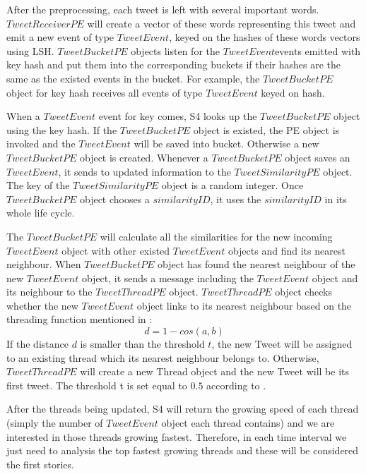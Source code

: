 \documentclass[a4paper,12pt]{article}
\begin{document}
After the preprocessing, each tweet is left with several important words. $TweetReceiverPE$ will create a vector of these words representing this tweet and emit a new event of type $TweetEvent$, keyed on the hashes of these words vectors using LSH. $TweetBucketPE$ objects listen for the $TweetEvent $events emitted with key hash and put them into the corresponding buckets if their hashes are the same as the existed events in the bucket. For example, the $TweetBucketPE$ object for key hash receives all events of type $TweetEvent$ keyed on hash. \newline

When a $TweetEvent$ event for key comes, S4 looks up the $TweetBucketPE$ object using the key hash. If the $TweetBucketPE$ object is existed, the PE object is invoked and the $TweetEvent$ will be saved into bucket. Otherwise a new $TweetBucketPE$ object is created. Whenever a $TweetBucketPE$ object saves an $TweetEvent$, it sends to updated information to the $TweetSimilarityPE$ object. The key of the $TweetSimilarityPE$ object is a random integer. Once $TweetBucketPE$ object chooses a $similarityID$, it uses the $similarityID$ in its whole life cycle. \newline

The $TweetBucketPE$ will calculate all the similarities for the new incoming $TweetEvent$ object with other existed $TweetEvent$ objects and find its nearest neighbour. When $TweetBucketPE$ object has found the nearest neighbour of the new $TweetEvent$ object, it sends a message including the $TweetEvent$ object and its neighbour to the $TweetThreadPE$ object. $TweetThreadPE$ object checks whether the new $TweetEvent$ object links to its nearest neighbour based on the threading function mentioned in \cite{Petrovic:2010}: $$d=1-cos(a,b)$$
If the distance $d$ is smaller than the threshold $t$, the new Tweet will be assigned to an existing thread which its nearest neighbour belongs to. Otherwise, $TweetThreadPE$ will create a new Thread object and the new Tweet will be its first tweet. The threshold t is set equal to $0.5$ according to \cite{Petrovic:2010}. \newline

	After the threads being updated, S4 will return the growing speed of each thread (simply the number of $TweetEvent$ object each thread contains) and we are interested in those threads growing fastest. Therefore, in each time interval we just need to analysis the top fastest growing threads and these will be considered the first stories. 
\end{document}
